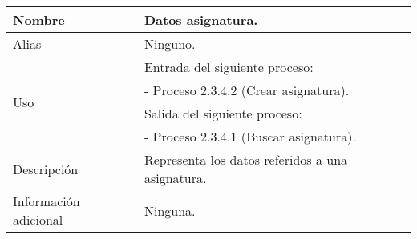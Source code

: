 \begin{center}
  \begin{tabular}{| l | p{9cm} |}
    \hline
    Nombre & \textbf{Datos asignatura}.\\
    \hline
    Alias & Ninguno.\\
    \hline
    \multirow{4}{*}{Uso} & Entrada del siguiente proceso:\\
                         & - Proceso 2.3.4.2 (Crear asignatura).\\
                         & Salida del siguiente proceso:\\
                         & - Proceso 2.3.4.1 (Buscar asignatura).\\
    \hline
    Descripción & Representa los datos referidos a una asignatura.\\
    \hline
    Información adicional & Ninguna.\\
    \hline
  \end{tabular}
\end{center}
